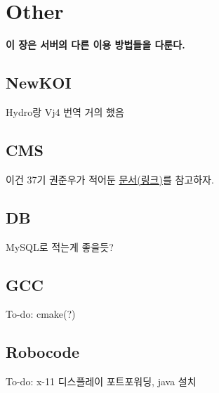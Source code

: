 
\graphicspath{{./chap5/images/}}  
\chapter{Other}

\textbf{이 장은 서버의 다른 이용 방법들을 다룬다.}

\section{NewKOI}
Hydro랑 Vj4 번역 거의 했음
\section{CMS}

이건 37기 권준우가 적어둔 \href{https://github.com/gshslinuxintro/cslab.gs.hs.kr/tree/master/docs/cms}{문서(링크)}를 참고하자. 
\section{DB}
MySQL로 적는게 좋을듯?
\section{GCC}
To-do: cmake(?)
\section{Robocode}
To-do: x-11 디스플레이 포트포워딩, java 설치
